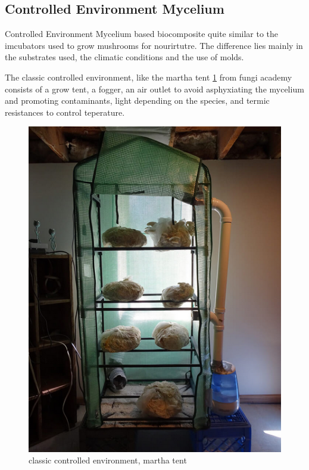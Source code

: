 





\subsection{ Controlled
Environment Mycelium}

Controlled Environment Mycelium based biocomposite quite similar to the imcubators used to grow mushrooms for nourirtutre. The difference lies mainly in the substrates used, the climatic conditions and the use of molds.

The classic controlled environment, like the martha tent \ref{fig:marthatent} 
from fungi academy consists of a grow tent, a fogger, an air outlet to avoid asphyxiating the mycelium and promoting contaminants, light depending on the species, and termic resistances to control teperature.  

\begin{figure}[h]
    \centering
    \includegraphics{images/classicalmyceliumtent.png}
    \caption{classic controlled environment, martha tent}
    \label{fig:marthatent}
\end{figure} 

